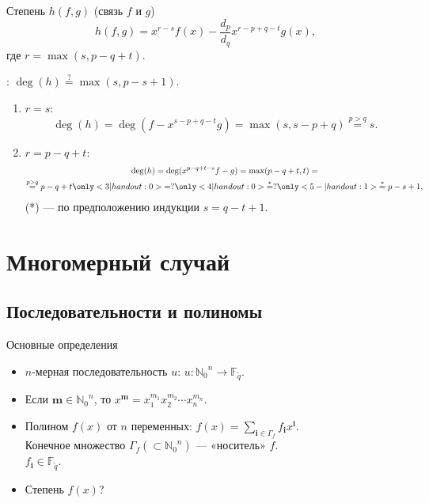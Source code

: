 \documentclass[handout,envcountsect,ignorenonframetext,hyperref={pdftex,unicode,urlcolor=blue},
xcolor=dvipsnames]{beamer}
\newcommand{\bstructure}[1]{{\bfseries \structure{#1}}}
\newcommand{\F}{\ensuremath{\mathbb{F}_{\tilde{q}}}}
\newcommand{\N}{\ensuremath{\mathbb{N}_0}}
\newcommand{\pt}[1]{\ensuremath{\boldsymbol{#1}}}
\begin{document}
\begin{frame}{Степень $h(f,g)$ (связь $f$ и $g$)}
$$h(f,g)=x^{r-s}f(x) - \frac{d_p}{d_q}x^{r-p+q-t}g(x),$$
где $r=\max {(s, p - q + t)}$.

\bstructure{Вопрос}: $\deg(h)\stackrel{?}{=}\max(s,p-s+1)$.
\begin{enumerate}
    \item<2-> $r=s$:
    $$\deg (h) = \deg (f - x^{s-p+q-t}g) = \max(s, s - p + q) \stackrel{p>q}{=}
    s.$$
    \item<3-> $r=p - q + t$:
    \begin{multline*}
    \deg(h)=\deg(x^{p-q+t-s}f - g) = \max(p-q+t,t) =\\
        \stackrel{p>q}{=}p-q+t
        \only<3|handout:0>{=?}
        \only<4|handout:0>{\stackrel{*}{=}?}
        \only<5-|handout:1>{\stackrel{*}{=}p-s+1,}
    \end{multline*}
    (*) — по предположению индукции $s=q-t+1$.
\end{enumerate}

\end{frame}

\section{Многомерный случай}

\subsection{Последовательности и полиномы}
\begin{frame}{Основные определения}
\begin{itemize}
    \item<+-> $n$-мерная последовательность $u$: $u\colon\N^n\to\F$.
    \item<+-> Если $\pt m\in \N^n $, то $x^{\pt m} = x_1^{m_1}
    x_2^{m_2}\cdots x_n^{m_n}$.
    \item<+-> Полином $f(x)$ от $n$ переменных: $f(x) = \sum_{\pt i\in
    \Gamma_f}f_{\pt i}x^{\pt i}$.\\Конечное множество $\Gamma_f (\subset \N^n)$
    — «носитель» $f$.\\$f_{\pt i}\in \F$.
    \item<+-> \alert{Степень $f(x)$?}
\end{itemize}
\end{frame}
\end{document}
